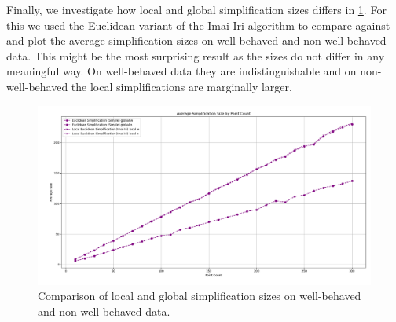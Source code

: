 Finally, we investigate how local and global simplification sizes differs in \cref{fig:res-local-global}. For this we used the Euclidean variant of the Imai-Iri algorithm to compare against and plot the average simplification sizes on well-behaved and non-well-behaved data. This might be the most surprising result as the sizes do not differ in any meaningful way. On well-behaved data they are indistinguishable and on non-well-behaved the local simplifications are marginally larger.


\begin{figure}[b]
  \centering
	\includegraphics[scale=0.4]{./figures/res_local_global.png}
  \caption{Comparison of local and global simplification sizes on well-behaved and non-well-behaved data.}
  \label{fig:res-local-global}
\end{figure}
